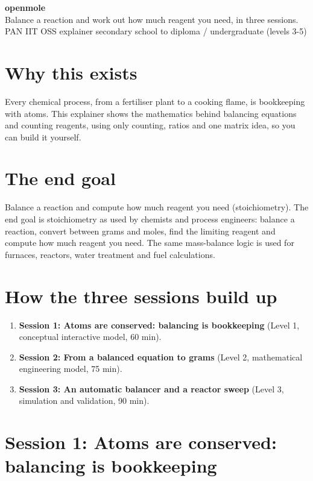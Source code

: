 \documentclass[11pt,a4paper]{article}
\begin{document}
\begin{center}{\LARGE\bfseries openmole}\\[0.4em]{\large Balance a reaction and work out how much reagent you need, in three sessions.}\\[0.2em]\small PAN IIT OSS explainer \textbullet{} secondary school to diploma / undergraduate (levels 3-5)\end{center}

\section*{Why this exists}
Every chemical process, from a fertiliser plant to a cooking flame, is bookkeeping with atoms. This explainer shows the mathematics behind balancing equations and counting reagents, using only counting, ratios and one matrix idea, so you can build it yourself.

\section*{The end goal}
Balance a reaction and compute how much reagent you need (stoichiometry). The end goal is stoichiometry as used by chemists and process engineers: balance a reaction, convert between grams and moles, find the limiting reagent and compute how much reagent you need. The same mass-balance logic is used for furnaces, reactors, water treatment and fuel calculations.

\section*{How the three sessions build up}
\begin{enumerate}[nosep]
\item \textbf{Session 1: Atoms are conserved: balancing is bookkeeping} (Level 1, conceptual interactive model, 60 min).
\item \textbf{Session 2: From a balanced equation to grams} (Level 2, mathematical engineering model, 75 min).
\item \textbf{Session 3: An automatic balancer and a reactor sweep} (Level 3, simulation and validation, 90 min).
\end{enumerate}

\section{Session 1: Atoms are conserved: balancing is bookkeeping}
\end{document}
